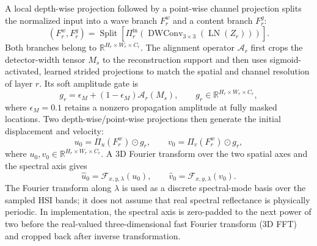 \documentclass[letterpaper]{article} %
\begin{document}
A local depth-wise projection followed by a point-wise channel projection splits the normalized input into a wave branch \(F_r^w\) and a content branch \(F_r^g\):
\begin{equation}
\left(F_r^w,F_r^g\right)
=\operatorname{Split}\!\left[
\Pi_r^{\mathrm{in}}\!\left(
\operatorname{DWConv}_{3\times3}(\operatorname{LN}(Z_r))
\right)\right].
\label{eq:swp_split}
\end{equation}
Both branches belong to \(\mathbb{R}^{H_r\times W_r\times C_r}\).
The alignment operator \(\mathcal{A}_r\) first crops the detector-width tensor \(M_s\) to the reconstruction support and then uses sigmoid-activated, learned strided projections to match the spatial and channel resolution of layer \(r\).
Its soft amplitude gate is
\begin{equation}
g_r=\epsilon_M+(1-\epsilon_M)\mathcal{A}_r(M_s),
\qquad
g_r\in\mathbb{R}^{H_r\times W_r\times C_r},
\label{eq:mask_gate}
\end{equation}
where \(\epsilon_M=0.1\) retains a nonzero propagation amplitude at fully masked locations.
Two depth-wise/point-wise projections then generate the initial displacement and velocity:
\begin{equation}
u_0=\Pi_u(F_r^w)\odot g_r,\qquad
v_0=\Pi_v(F_r^w)\odot g_r,
\label{eq:uv0_spatial}
\end{equation}
where \(u_0,v_0\in\mathbb{R}^{H_r\times W_r\times C_r}\).
A 3D Fourier transform over the two spatial axes and the spectral axis gives
\begin{equation}
\hat u_0=\mathcal{F}_{x,y,\lambda}(u_0),
\qquad
\hat v_0=\mathcal{F}_{x,y,\lambda}(v_0).
\label{eq:uv0}
\end{equation}
The Fourier transform along \(\lambda\) is used as a discrete spectral-mode basis over the sampled HSI bands; it does not assume that real spectral reflectance is physically periodic.
In implementation, the spectral axis is zero-padded to the next power of two before the real-valued three-dimensional fast Fourier transform (3D FFT) and cropped back after inverse transformation.
\end{document}
